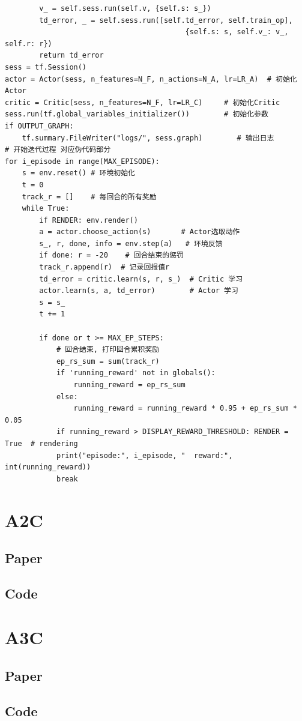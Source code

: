 \documentclass{book}
\begin{document}
\begin{lstlisting}
        v_ = self.sess.run(self.v, {self.s: s_})
        td_error, _ = self.sess.run([self.td_error, self.train_op],
                                          {self.s: s, self.v_: v_, self.r: r})
        return td_error
sess = tf.Session()
actor = Actor(sess, n_features=N_F, n_actions=N_A, lr=LR_A)  # 初始化Actor
critic = Critic(sess, n_features=N_F, lr=LR_C)     # 初始化Critic
sess.run(tf.global_variables_initializer())        # 初始化参数
if OUTPUT_GRAPH:
    tf.summary.FileWriter("logs/", sess.graph)        # 输出日志
# 开始迭代过程 对应伪代码部分
for i_episode in range(MAX_EPISODE):
    s = env.reset() # 环境初始化
    t = 0
    track_r = []    # 每回合的所有奖励
    while True:
        if RENDER: env.render()
        a = actor.choose_action(s)       # Actor选取动作
        s_, r, done, info = env.step(a)   # 环境反馈
        if done: r = -20    # 回合结束的惩罚
        track_r.append(r)  # 记录回报值r
        td_error = critic.learn(s, r, s_)  # Critic 学习
        actor.learn(s, a, td_error)        # Actor 学习
        s = s_
        t += 1

        if done or t >= MAX_EP_STEPS:
            # 回合结束, 打印回合累积奖励
            ep_rs_sum = sum(track_r)
            if 'running_reward' not in globals():
                running_reward = ep_rs_sum
            else:
                running_reward = running_reward * 0.95 + ep_rs_sum * 0.05
            if running_reward > DISPLAY_REWARD_THRESHOLD: RENDER = True  # rendering
            print("episode:", i_episode, "  reward:", int(running_reward))
            break
\end{lstlisting}
\section{A2C}
\subsection{Paper}
\subsection{Code}
\section{A3C}
\subsection{Paper}
\subsection{Code}
\end{document}

